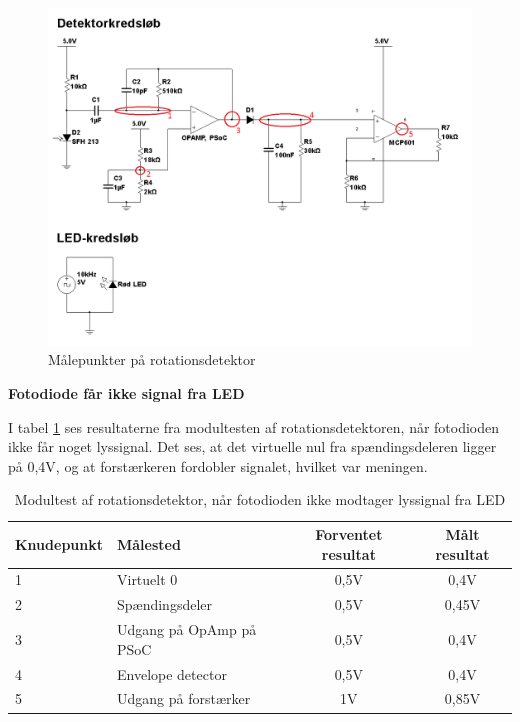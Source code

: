 \begin{figure}[H]
	\centering
	\includegraphics[width=\textwidth]{Test/images/rotationsdetektor_maalepunkter}
	\caption{Målepunkter på rotationsdetektor}
	\label{fig:målepunkter}
\end{figure}

\noindent \textbf{Fotodiode får ikke signal fra LED}

\noindent I tabel \ref{dioderIkkeSe} ses resultaterne fra modultesten af rotationsdetektoren, når fotodioden ikke får noget lyssignal. Det ses, at det virtuelle nul fra spændingsdeleren ligger på 0,4V, og at forstærkeren fordobler signalet, hvilket var meningen. 

\begin{table}[H]
	\centering
	\begin{tabular}{|l|l|c|c|}
		\hline
		\textbf{Knudepunkt}		& \textbf{Målested}       & \textbf{Forventet resultat} & \textbf{Målt resultat} \\ \hline
		1						& Virtuelt 0              & 0,5V                        & 0,4V                   \\ \hline
		2						& Spændingsdeler          & 0,5V                        & 0,45V                  \\ \hline
		3						& Udgang på OpAmp på PSoC & 0,5V                        & 0,4V                   \\ \hline
		4 						& Envelope detector       & 0,5V                        & 0,4V                   \\ \hline
		5 						& Udgang på forstærker    & 1V                          & 0,85V                  \\ \hline
	\end{tabular}
	\caption{Modultest af rotationsdetektor, når fotodioden ikke modtager lyssignal fra LED}
	\label{dioderIkkeSe}
\end{table}

